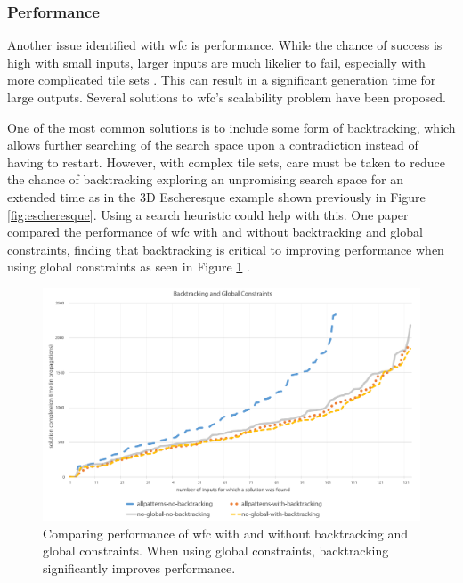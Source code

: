 
\subsubsection{Performance}\label{sec:performance}
Another issue identified with \acrshort{wfc} is performance. While the chance of success is high with small inputs, larger inputs are much likelier to fail, especially with more complicated tile sets \cite{WFC_ConstraintSolving_and_ML}. This can result in a significant generation time for large outputs. Several solutions to \acrshort{wfc}'s scalability problem have been proposed.%

One of the most common solutions is to include some form of backtracking, which allows further searching of the search space upon a contradiction instead of having to restart. However, with complex tile sets, care must be taken to reduce the chance of backtracking exploring an unpromising search space for an extended time as in the 3D Escheresque example shown previously in Figure \ref{fig:escheresque}. Using a search heuristic could help with this. One paper compared the performance of \acrshort{wfc} with and without backtracking and global constraints, finding that backtracking is critical to improving performance when using global constraints as seen in Figure \ref{fig:backtrackingPerformance} \cite{WFC_ConstraintSolving_and_ML}.

\begin{figure}[H]
    \centering
    \includegraphics[width=\textwidth, height=0.3\textheight, keepaspectratio]{Images/BacktrackingPerformance.png}
    \caption{Comparing performance of \acrshort{wfc} with and without backtracking and global constraints. When using global constraints, backtracking significantly improves performance. \cite{WFC_ConstraintSolving_and_ML}}
    \label{fig:backtrackingPerformance}
\end{figure}

